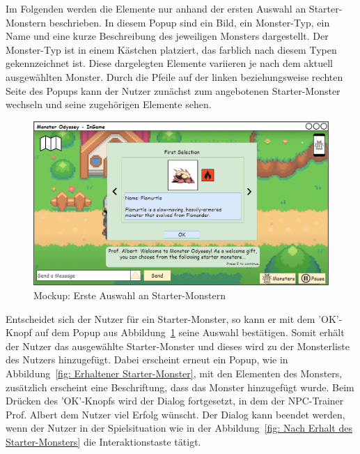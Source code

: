 Im Folgenden werden die Elemente nur anhand der ersten Auswahl an Starter-Monstern beschrieben.
In diesem Popup sind ein Bild, ein Monster-Typ, ein Name und eine kurze Beschreibung des jeweiligen Monsters dargestellt. Der Monster-Typ ist in einem Kästchen platziert, das farblich nach diesem Typen gekennzeichnet ist. Diese dargelegten Elemente variieren je nach dem aktuell ausgewählten Monster.
Durch die Pfeile auf der linken beziehungsweise rechten Seite des Popups kann der Nutzer zunächst zum angebotenen Starter-Monster wechseln und seine zugehörigen Elemente sehen.
\begin{figure}[H]
    \center
    \includegraphics[scale=\scale]{images/mockups/Starter/PlayerAndProfMonsterSelection}
    \caption{Mockup: Erste Auswahl an Starter-Monstern}
    \label{fig: Erste Auswahl an Starter-Monstern}
\end{figure}
Entscheidet sich der Nutzer für ein Starter-Monster, so kann er mit dem 'OK'-Knopf auf dem Popup aus Abbildung~\ref{fig: Erste Auswahl an Starter-Monstern} seine Auswahl bestätigen.  Somit erhält der Nutzer das ausgewählte Starter-Monster und dieses wird zu der Monsterliste des Nutzers hinzugefügt. Dabei erscheint erneut ein Popup, wie in Abbildung~\ref{fig: Erhaltener Starter-Monster}, mit den Elementen des Monsters, zusätzlich erscheint eine Beschriftung, dass das Monster hinzugefügt wurde.
Beim Drücken des 'OK'-Knopfs wird der Dialog fortgesetzt, in dem der NPC-Trainer Prof. Albert dem Nutzer viel Erfolg wünscht. Der Dialog kann beendet werden, wenn der Nutzer in der Spielsituation wie in der Abbildung~\ref{fig: Nach Erhalt des Starter-Monsters} die Interaktionstaste tätigt.

